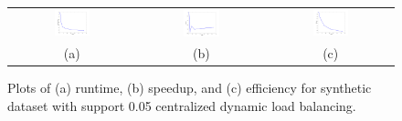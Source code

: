 \begin{figure}[H]
\centering
\begin{tabular}{ccc}
\includegraphics[width=0.3\textwidth]{synth_dyn_time.png} &
\includegraphics[width=0.3\textwidth]{synth_dyn_speedup.png} &
\includegraphics[width=0.3\textwidth]{synth_dyn_efficiency.png} \\
(a) & (b) & (c) \\
\end{tabular}
\caption{Plots of (a) runtime, (b) speedup, and (c) efficiency for
         synthetic dataset with support 0.05 centralized dynamic load
         balancing.}
\label{fig:synth_dyn}
\end{figure}


